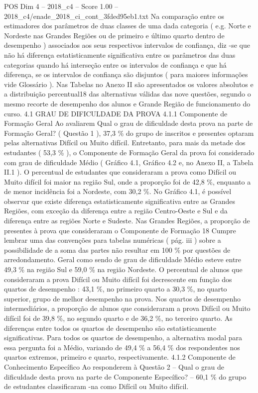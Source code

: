 \begin{textsample}{POS Dim 4 – 2018\_c4 – Score 1.00 – 2018\_c4/enade\_2018\_ci\_cont\_3fded95eb1.txt}
Na comparação entre os estimadores dos parâmetros de duas classes de uma dada categoria ( e.g.
Norte e Nordeste nas Grandes Regiões ou de primeiro e último quarto dentro de desempenho ) associados aos seus respectivos intervalos de confiança, diz -se que não há diferença estatisticamente significativa entre os parâmetros das duas categorias quando há interseção entre os intervalos de confiança e que há diferença, se os intervalos de confiança são disjuntos ( para maiores informações vide Glossário ).
Nas Tabelas no Anexo II são apresentados os valores absolutos e a distribuição percentual18 das alternativas válidas das nove questões, segundo o mesmo recorte de desempenho dos alunos e Grande Região de funcionamento do curso. 4.1 GRAU DE DIFICULDADE DA PROVA 4.1.1 Componente de Formação Geral Ao avaliarem Qual o grau de dificuldade desta prova na parte de Formação Geral? ( Questão 1 ), 37,3 \% do grupo de inscritos e presentes optaram pelas alternativas Difícil ou Muito difícil.
Entretanto, para mais da metade dos estudantes ( 53,3 \% ), o Componente de Formação Geral da prova foi considerado com grau de dificuldade Médio ( Gráfico 4.1, Gráfico 4.2 e, no Anexo II, a Tabela II.1 ).
O percentual de estudantes que consideraram a prova como Difícil ou Muito difícil foi maior na região Sul, onde a proporção foi de 42,8 \%, enquanto a de menor incidência foi a Nordeste, com 30,2 \%.
No Gráfico 4.1, é possível observar que existe diferença estatisticamente significativa entre as Grandes Regiões, com exceção da diferença entre a região Centro-Oeste e Sul e da diferença entre as regiões Norte e Sudeste.
Nas Grandes Regiões, a proporção de presentes à prova que consideraram o Componente de Formação 18 Cumpre lembrar uma das convenções para tabelas numéricas ( pág. iii ) sobre a possibilidade de a soma das partes não resultar em 100 \% por questões de arredondamento.
Geral como sendo de grau de dificuldade Médio esteve entre 49,3 \% na região Sul e 59,0 \% na região Nordeste.
O percentual de alunos que consideraram a prova Difícil ou Muito difícil foi decrescente em função dos quartos de desempenho : 43,1 \%, no primeiro quarto a 30,3 \%, no quarto superior, grupo de melhor desempenho na prova.
Nos quartos de desempenho intermediários, a proporção de alunos que consideraram a prova Difícil ou Muito difícil foi de 39,8 \%, no segundo quarto e de 36,2 \%, no terceiro quarto.
As diferenças entre todos os quartos de desempenho são estatisticamente significativas.
Para todos os quartos de desempenho, a alternativa modal para essa pergunta foi a Médio, variando de 49,4 \% a 56,4 \% dos respondentes nos quartos extremos, primeiro e quarto, respectivamente. 4.1.2 Componente de Conhecimento Específico Ao responderem à Questão 2 – Qual o grau de dificuldade desta prova na parte de Componente Específico? – 60,1 \% do grupo de estudantes classificaram -na como Difícil ou Muito difícil.

\end{textsample}
